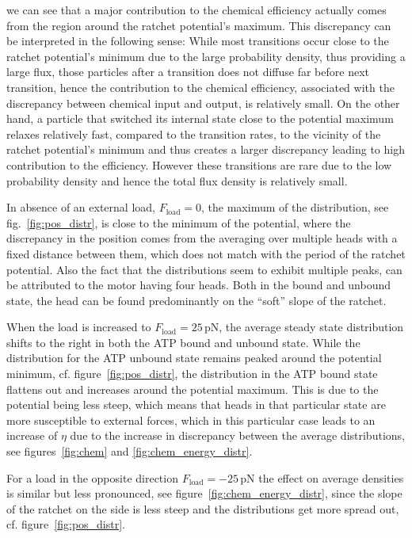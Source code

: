 \documentclass[aps,pre,twocolumn,showpacs,showkeys,superscriptaddress,floatfix]{revtex4-1}
\begin{document}
we can see that a major contribution to the chemical efficiency actually comes from the region around the ratchet potential's maximum.
This discrepancy can be interpreted in the following sense: 
While most transitions occur close to the ratchet potential's minimum due to the large probability density, thus providing a large flux, 
those particles after a transition does not diffuse far before next transition, 
hence the contribution to the chemical efficiency, associated with the discrepancy between chemical input and output, is relatively small. 
On the other hand, a particle that switched its internal state close to the potential maximum relaxes relatively fast, compared to the transition rates, 
to the vicinity of the ratchet potential's minimum and thus creates a larger discrepancy leading to high contribution to the efficiency. 
However these transitions are rare due to the low probability density and hence the total flux density is relatively small.  

In absence of an external load, $F_\text{load}=0$, 
the maximum of the distribution, see fig.~\ref{fig:pos_distr}, is close to the minimum of the potential,  
where the discrepancy in the position comes from the averaging over multiple heads with a fixed distance between them, 
which does not match with the period of the ratchet potential. 
Also the fact that the distributions seem to exhibit multiple peaks, can be attributed to the motor having four heads. 
Both in the bound and unbound state, the head can be found predominantly on the ``soft'' slope of the ratchet.

When the load is increased to $F_\text{load} = 25 \, \mathrm{pN}$, the average steady state distribution shifts to the right in both the ATP bound and unbound state. 
While the distribution for the ATP unbound state remains peaked around the potential minimum, cf. figure~\ref{fig:pos_distr},
the distribution in the ATP bound state flattens out and increases around the potential maximum. 
This is due to the potential being less steep, which means that heads in that particular state are more susceptible to external forces,  
which in this particular case leads to an increase of $\eta$ due to the increase in discrepancy between the average distributions, 
see figures~\ref{fig:chem} and \ref{fig:chem_energy_distr}. 

For a load in the opposite direction $F_\text{load}= -25 \, \mathrm{pN}$ the effect on average densities is similar but less pronounced, 
see figure~\ref{fig:chem_energy_distr}, 
since the slope of the ratchet on the side is less steep and the distributions get more spread out, cf. figure~\ref{fig:pos_distr}. 
\end{document}
